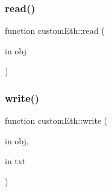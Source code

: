 \mbox{\label{namespacecustom_eth_a42b4507db8236b8a8a6632decfe76543}} 
\subsubsection{\texorpdfstring{read()}{read()}}
{\footnotesize\ttfamily function custom\+Eth\+::read (\begin{DoxyParamCaption}\item[{in}]{obj }\end{DoxyParamCaption})}

\mbox{\label{namespacecustom_eth_acc2e5fdb38158d81a1347fd6dd2e75de}} 
\subsubsection{\texorpdfstring{write()}{write()}}
{\footnotesize\ttfamily function custom\+Eth\+::write (\begin{DoxyParamCaption}\item[{in}]{obj,  }\item[{in}]{txt }\end{DoxyParamCaption})}

